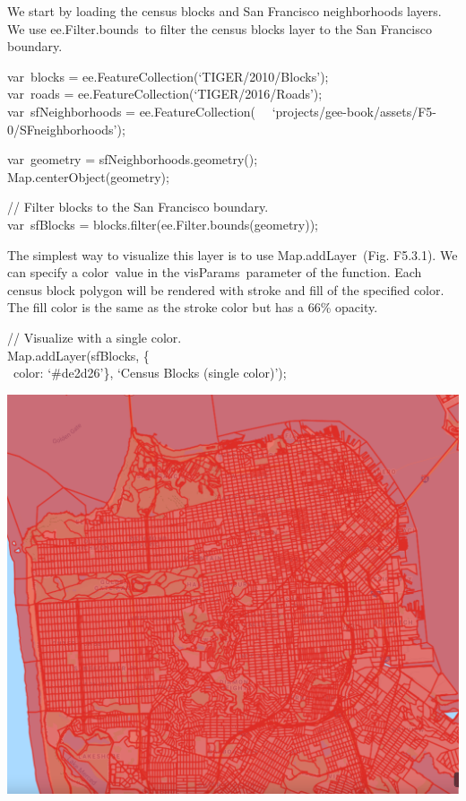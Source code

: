 \documentclass[
  letterpaper,
  DIV=11,
  numbers=noendperiod]{scrreprt}
\begin{document}
We start by loading the census blocks and San Francisco neighborhoods
layers. We use ee.Filter.bounds~to filter the census blocks layer to the
San Francisco boundary.

var~blocks = ee.FeatureCollection(`TIGER/2010/Blocks');\\
var~roads = ee.FeatureCollection(`TIGER/2016/Roads');\\
var~sfNeighborhoods = ee.FeatureCollection(~
~`projects/gee-book/assets/F5-0/SFneighborhoods');

var~geometry = sfNeighborhoods.geometry();\\
Map.centerObject(geometry);

// Filter blocks to the San Francisco boundary.\\
var~sfBlocks = blocks.filter(ee.Filter.bounds(geometry));

The simplest way to visualize this layer is to use Map.addLayer~(Fig.
F5.3.1). We can specify a color~value in the visParams~parameter of the
function. Each census block polygon will be rendered with stroke and
fill of the specified color. The fill color is the same as the stroke
color but has a 66\% opacity.

// Visualize with a single color.\\
Map.addLayer(sfBlocks, \{\\
\hspace*{0.333em} ~color: `\#de2d26'\}, `Census Blocks (single color)');

\includegraphics{./F5/image34.png}
\end{document}
